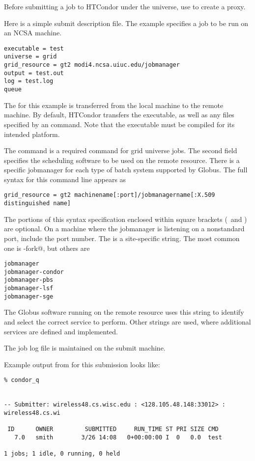 
Before submitting a job to HTCondor under the  universe,
use  to create a proxy.

Here is a simple submit description file.
The example specifies a  job to be run on
an NCSA machine.

\begin{verbatim}
executable = test
universe = grid
grid_resource = gt2 modi4.ncsa.uiuc.edu/jobmanager
output = test.out
log = test.log
queue
\end{verbatim} 

The 
for this example is
transferred from the local machine to the remote machine.
By default, HTCondor transfers the executable, as well as any
files specified by an  command.
Note that the executable must be compiled for its intended platform.

The command  is a required command
for grid universe jobs.
The second field specifies the scheduling software
to be used on the remote resource.
There is a specific jobmanager for each type of
batch system supported by Globus.
The full syntax for this command line appears as
\footnotesize
\begin{verbatim}
grid_resource = gt2 machinename[:port]/jobmanagername[:X.509 distinguished name]
\end{verbatim}
\normalsize
The portions of this syntax specification enclosed within
square brackets (\Lbr\ and \Rbr) are optional.
On a machine where the jobmanager is listening on a nonstandard port,
include the port number.
The \verb@jobmanagername@ is a site-specific string.
The most common one is \verb@jobmanager-fork@, but others are
\begin{verbatim}
jobmanager
jobmanager-condor
jobmanager-pbs
jobmanager-lsf
jobmanager-sge
\end{verbatim}
The Globus software running on the remote resource
uses this string to identify and select the correct service
to perform.
Other \verb@jobmanagername@ strings are used,
where additional services are defined and implemented.


The job log file is maintained on the submit machine.

Example output from 
 for this submission looks like:
\footnotesize
\begin{verbatim}
% condor_q


-- Submitter: wireless48.cs.wisc.edu : <128.105.48.148:33012> : wireless48.cs.wi

 ID      OWNER         SUBMITTED     RUN_TIME ST PRI SIZE CMD
   7.0   smith        3/26 14:08   0+00:00:00 I  0   0.0  test

1 jobs; 1 idle, 0 running, 0 held
\end{verbatim}
\normalsize

